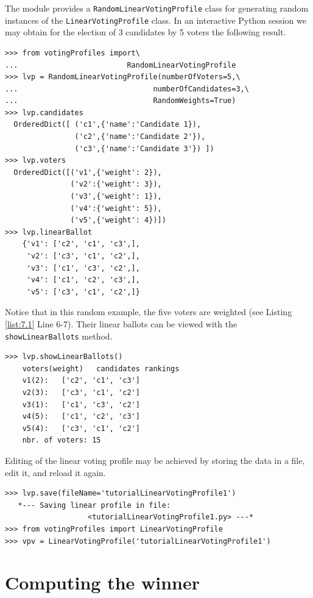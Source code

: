 The module provides a \texttt{RandomLinearVotingProfile} class  for generating random instances of the \texttt{LinearVotingProfile} class. In an interactive Python session we may obtain for the election of 3 candidates by 5 voters the following result.
\begin{lstlisting}[caption={Example of random linear voting profile},label=list:7.1]
>>> from votingProfiles import\
...                         RandomLinearVotingProfile
>>> lvp = RandomLinearVotingProfile(numberOfVoters=5,\
...                               numberOfCandidates=3,\
...                               RandomWeights=True) 
>>> lvp.candidates
  OrderedDict([ ('c1',{'name':'Candidate 1}),
                ('c2',{'name':'Candidate 2'}),
                ('c3',{'name':'Candidate 3'}) ])
>>> lvp.voters
  OrderedDict([('v1',{'weight': 2}),
               ('v2':{'weight': 3}), 
               ('v3',{'weight': 1}),
               ('v4':{'weight': 5}),
               ('v5',{'weight': 4})])
>>> lvp.linearBallot
    {'v1': ['c2', 'c1', 'c3',],
     'v2': ['c3', 'c1', 'c2',],
     'v3': ['c1', 'c3', 'c2',],
     'v4': ['c1', 'c2', 'c3',],
     'v5': ['c3', 'c1', 'c2',]} 
 \end{lstlisting}
Notice that in this random example, the five voters are weighted (see Listing \ref{list:7.1} Line 6-7). Their linear ballots can be viewed with the \texttt{showLinearBallots} method.
\begin{lstlisting}
>>> lvp.showLinearBallots()
    voters(weight)	 candidates rankings
    v1(2): 	 ['c2', 'c1', 'c3']
    v2(3): 	 ['c3', 'c1', 'c2']
    v3(1): 	 ['c1', 'c3', 'c2']
    v4(5): 	 ['c1', 'c2', 'c3']
    v5(4): 	 ['c3', 'c1', 'c2']
    nbr. of voters: 15
\end{lstlisting}

Editing of the linear voting profile may be achieved by storing the data in a file, edit it, and reload it again.
\begin{lstlisting}
>>> lvp.save(fileName='tutorialLinearVotingProfile1')
   *--- Saving linear profile in file:
                   <tutorialLinearVotingProfile1.py> ---*
>>> from votingProfiles import LinearVotingProfile
>>> vpv = LinearVotingProfile('tutorialLinearVotingProfile1')
\end{lstlisting}

\section{Computing the winner}
\label{sec:7.2}

